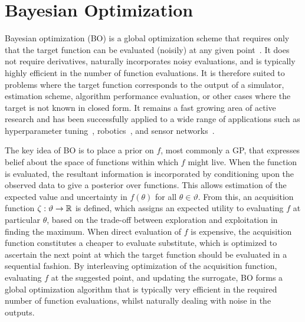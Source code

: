 
\section{Bayesian Optimization}
\label{sec:opt:BO}

Bayesian optimization (BO) is a 
global optimization scheme that requires only that the target
function can be evaluated (noisily) at any given
 point~\citep{movckus1975bayesian,jones1998efficient,osborne2009gaussian,brochu2010tutorial,shahriari2016taking}.  
 It does not require derivatives,
naturally incorporates noisy evaluations, and is typically highly efficient 
in the number of function evaluations.  It is therefore suited to
problems where the target function corresponds to the output of a simulator,
estimation scheme, algorithm performance evaluation, or other cases where
the target is not known in closed form.  It remains a fast growing area of
active research and has been successfully applied to 
a wide range of applications such as hyperparameter tuning~\citep{snoek2012practical},
robotics~\citep{calandra2016bayesian}, and sensor networks~\citep{garnett2010bayesian}.

The key idea of BO is to place a prior on $f$, most commonly a GP,
 that expresses belief about the space of functions within which $f$ might live.  When the function is evaluated, the resultant information is incorporated by conditioning upon the observed data to give a posterior over functions.  
This allows estimation of the expected value and uncertainty in $f\left(\theta\right)$ for all $\theta \in \vartheta$.  
From this, an acquisition function $\zeta : \vartheta \rightarrow \mathbb{R}$ is defined, which assigns an expected utility to evaluating $f$ at particular $\theta$, based on the trade-off between exploration and exploitation in finding the maximum.  When direct evaluation of $f$ is expensive, the acquisition function constitutes a cheaper to evaluate substitute, which is optimized to ascertain the next point at which the target function should be evaluated in a sequential fashion.  By interleaving optimization of the acquisition function, evaluating $f$ at the suggested point, and updating the surrogate, BO forms a global optimization algorithm that is typically very efficient in the required number of function evaluations, whilst naturally dealing with noise in the outputs.  

